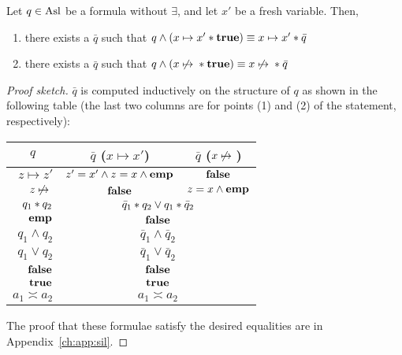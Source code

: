 \begin{lemma}\label{lmm:sil:separation-assertion-rewrite}
	Let $q \in \text{Asl}$ be a formula without $\exists$, and let $x'$ be a fresh variable. Then,
	\begin{enumerate}
		\item there exists a $\bar{q}$ such that $q \land (x \mapsto x' * \textbf{true}) \equiv x \mapsto x' * \bar{q}$
		\item there exists a $\bar{q}$ such that $q \land (x \not\mapsto{} * \textbf{true}) \equiv x \not\mapsto{} * \bar{q}$
	\end{enumerate}
\end{lemma}
\begin{proof}[Proof sketch]
	$\bar{q}$ is computed inductively on the structure of $q$ as shown in the following table (the last two columns are for points (1) and (2) of the statement, respectively):

	\begin{center}
		\begin{tabular}{r|c@{\qquad\quad}c@{\qquad\quad}}
			\multicolumn{1}{c|}{$q$} & $\bar{q}$ \quad ($x \mapsto x'$)                                       & $\bar{q}$ \quad ($x \not\mapsto{}$) \\
			\hline
			$z \mapsto z'$           & $z' = x' \land z = x \land \textbf{emp}$                                       & $\textbf{false}$                       \\
			$z \not\mapsto{}{}$           & $\textbf{false}$                                                               & $z = x \land \textbf{emp}$             \\
			$q_1 * q_2$        & \multicolumn{2}{c}{$\bar{q}_1 * q_2 \lor q_1 * \bar{q}_2$}                                  \\
			$\textbf{emp}$                   & \multicolumn{2}{c}{$\textbf{false}$}                                                                            \\
			$q_1 \land q_2$          & \multicolumn{2}{c}{$\bar{q}_1 \land \bar{q}_2$}                                                         \\
			$q_1 \lor q_2$           & \multicolumn{2}{c}{$\bar{q}_1 \lor \bar{q}_2$}                                                          \\
			$\textbf{false}$                 & \multicolumn{2}{c}{$\textbf{false}$}                                                                            \\
			$\textbf{true}$                  & \multicolumn{2}{c}{$\textbf{true}$}                                                                             \\
			$a_1 \asymp a_2$         & \multicolumn{2}{c}{$a_1 \asymp a_2$}
		\end{tabular}
	\end{center}

	The proof that these formulae satisfy the desired equalities are in Appendix~\ref{ch:app:sil}.
\end{proof}

